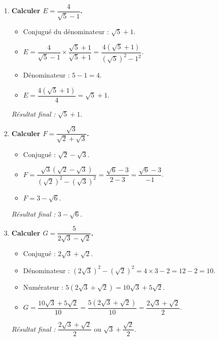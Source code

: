 \documentclass[11pt]{article}
\begin{document}
\begin{exemplebox}
\begin{enumerate}
    \item \textbf{Calculer $E = \dfrac{4}{\sqrt{5} - 1}$.}
    \begin{itemize}
        \item Conjugué du dénominateur : $\sqrt{5} + 1$.
        \item $E = \dfrac{4}{\sqrt{5}-1} \times \dfrac{\sqrt{5}+1}{\sqrt{5}+1} = \dfrac{4(\sqrt{5}+1)}{(\sqrt{5})^2 - 1^2}$.
        \item Dénominateur : $5 - 1 = 4$.
        \item $E = \dfrac{4(\sqrt{5}+1)}{4} = \sqrt{5} + 1$.
    \end{itemize}
    \textit{Résultat final :} $\boxed{\sqrt{5}+1}$.

    \item \textbf{Calculer $F = \dfrac{\sqrt{3}}{\sqrt{2}+\sqrt{3}}$.}
    \begin{itemize}
        \item Conjugué : $\sqrt{2} - \sqrt{3}$.
        \item $F = \dfrac{\sqrt{3}(\sqrt{2}-\sqrt{3})}{(\sqrt{2})^2 - (\sqrt{3})^2} = \dfrac{\sqrt{6} - 3}{2 - 3} = \dfrac{\sqrt{6} - 3}{-1}$.
        \item $F = 3 - \sqrt{6}$.
    \end{itemize}
    \textit{Résultat final :} $\boxed{3-\sqrt{6}}$.

    \item \textbf{Calculer $G = \dfrac{5}{2\sqrt{3} - \sqrt{2}}$.}
    \begin{itemize}
        \item Conjugué : $2\sqrt{3} + \sqrt{2}$.
        \item Dénominateur : $(2\sqrt{3})^2 - (\sqrt{2})^2 = 4\times 3 - 2 = 12 - 2 = 10$.
        \item Numérateur : $5(2\sqrt{3}+\sqrt{2}) = 10\sqrt{3} + 5\sqrt{2}$.
        \item $G = \dfrac{10\sqrt{3}+5\sqrt{2}}{10} = \dfrac{5(2\sqrt{3}+\sqrt{2})}{10} = \dfrac{2\sqrt{3}+\sqrt{2}}{2}$.
    \end{itemize}
    \textit{Résultat final :} $\boxed{\dfrac{2\sqrt{3}+\sqrt{2}}{2}}$ ou $\sqrt{3}+\dfrac{\sqrt{2}}{2}$.
\end{enumerate}
\end{exemplebox}
\end{document}
